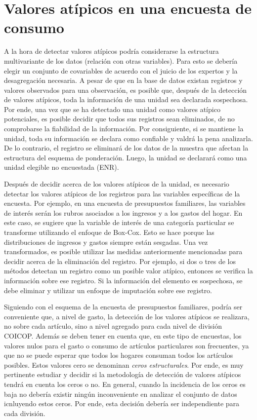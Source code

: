 \documentclass[
  10pt,
  spanish,
]{book}
\begin{document}
\hypertarget{valores-atuxedpicos-en-una-encuesta-de-consumo}{%
\section{Valores atípicos en una encuesta de consumo}\label{valores-atuxedpicos-en-una-encuesta-de-consumo}}

A la hora de detectar valores atípicos podría considerarse la estructura multivariante de los datos (relación con otras variables). Para esto se debería elegir un conjunto de covariables de acuerdo con el juicio de los expertos y la desagregación necesaria. A pesar de que en la base de datos existan registros y valores observados para una observación, es posible que, después de la detección de valores atípicos, toda la información de una unidad sea declarada sospechosa. Por ende, una vez que se ha detectado una unidad como valores atípico potenciales, es posible decidir que todos sus registros sean eliminados, de no comprobarse la fiabilidad de la información. Por consiguiente, si se mantiene la unidad, toda su información se declara como confiable y valdrá la pena analizarla. De lo contrario, el registro se eliminará de los datos de la muestra que afectan la estructura del esquema de ponderación. Luego, la unidad se declarará como una unidad elegible no encuestada (ENR).

Después de decidir acerca de los valores atípicos de la unidad, es necesario detectar los valores atípicos de los registros para las variables específicas de la encuesta. Por ejemplo, en una encuesta de presupuestos familiares, las variables de interés serán los rubros asociados a los ingresos y a los gastos del hogar. En este caso, se sugiere que la variable de interés de una categoría particular se transforme utilizando el enfoque de Box-Cox. Esto se hace porque las distribuciones de ingresos y gastos siempre están sesgadas. Una vez transformados, es posible utilizar las medidas anteriormente mencionadas para decidir acerca de la eliminación del registro. Por ejemplo, si dos o tres de los métodos detectan un registro como un posible valor atípico, entonces se verifica la información sobre ese registro. Si la información del elemento es sospechosa, se debe eliminar y utilizar un enfoque de imputación sobre ese registro.

Siguiendo con el esquema de la encuesta de presupuestos familiares, podría ser conveniente que, a nivel de gasto, la detección de los valores atípicos se realizara, no sobre cada artículo, sino a nivel agregado para cada nivel de división COICOP. Además se deben tener en cuenta que, en este tipo de encuestas, los valores nulos para el gasto o consumo de artículos particulares son frecuentes, ya que no se puede esperar que todos los hogares consuman todos los artículos posibles. Estos valores cero se denominan \emph{ceros estructurales}. Por ende, es muy pertinente estudiar y decidir si la metodología de detección de valores atípicos tendrá en cuenta los ceros o no. En general, cuando la incidencia de los ceros es baja no debería existir ningún inconveniente en analizar el conjunto de datos icnluyendo estos ceros. Por ende, esta decisión debería ser independiente para cada división.
\end{document}

